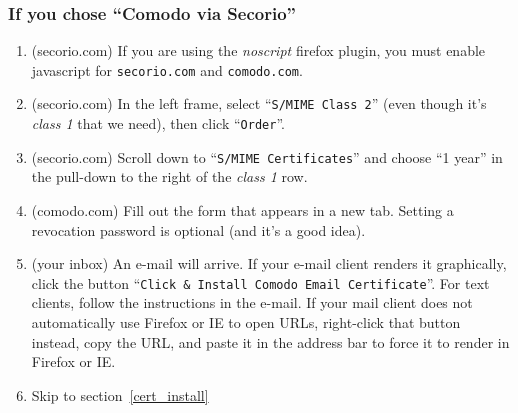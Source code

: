 \begin{minipage}{\textwidth}
\subsubsection{If you chose ``Comodo via Secorio''}
\begin{multicols}{2}
  \begin{enumerate}
  \item (secorio.com) If you are using the \emph{noscript} firefox
    plugin, you must enable javascript for \texttt{secorio.com} and
    \texttt{comodo.com}.
  \item (secorio.com) In the left frame, select ``\texttt{S/MIME Class
      2}'' (even though it's \emph{class 1} that we need), then click
    ``\texttt{Order}''.
  \item (secorio.com) Scroll down to ``\texttt{S/MIME Certificates}''
    and choose ``1 year'' in the pull-down to the right of the
    \emph{class 1} row.
  \item (comodo.com) Fill out the form that appears in a new tab.
    Setting a revocation password is optional (and it's a good
    idea).%
  \item (your inbox) An e-mail will arrive.  If your e-mail client
    renders it graphically, click the button ``\texttt{Click \&
      Install Comodo Email Certificate}''.  For text clients, follow
    the instructions in the e-mail.  If your mail client does not
    automatically use Firefox or IE to open URLs, right-click that
    button instead, copy the URL, and paste it in the address bar to
    force it to render in Firefox or IE.
  \item Skip to section~\ref{cert_install}
  \end{enumerate}
\end{multicols}
\end{minipage}\\[1em]
  
